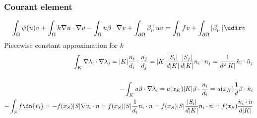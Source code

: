 \documentclass[11pt]{article}
\begin{document}
\subsubsection{Courant element}
%
%
\begin{align*}
\int_{\Omega}\psi(u)v +  \int_{\Omega}k \nabla u\cdot \nabla v -\int_{\Omega}u\beta\cdot\nabla v+\int_{\partial\Omega}\beta_n^+u v = \int_{\Omega}fv +\int_{\partial\Omega}|\beta_n^-|\udir v
\end{align*}
%
Piecewise constant approximation for $k$
%
\begin{align*}
\int_K \nabla \lambda_i \cdot \nabla \lambda_j = |K| \frac{n_i}{d_i}\cdot\frac{n_j}{d_j} = |K| \frac{|S_i|}{d|K|}\frac{|S_j|}{d|K|} n_i\cdot n_j
= \frac{1}{d^2|K|}\tilde n_i\cdot \tilde n_j\\
\\
-\int_K u \beta\cdot\nabla \lambda_i = u(x_K)|K| \beta\cdot\frac{n_i}{d_i} = u(x_K)\frac{1}{d}\beta\cdot\tilde n_i \\
- \int_S f \dn{v_i} = -f(x_S) |S| \nabla v_i \cdot n = f(x_S) |S| \frac{1}{d_i} n_i \cdot n= f(x_S) |S| \frac{|S_i|}{d|K|} n_i \cdot n
= f(x_S) \frac{\tilde n_i \cdot \tilde n}{d|K|}
\end{align*}
%

%
\end{document}
